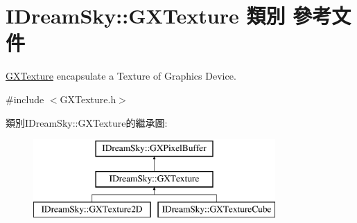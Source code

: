 \hypertarget{class_i_dream_sky_1_1_g_x_texture}{}\section{I\+Dream\+Sky\+:\+:G\+X\+Texture 類別 參考文件}
\label{class_i_dream_sky_1_1_g_x_texture}


\hyperlink{class_i_dream_sky_1_1_g_x_texture}{G\+X\+Texture} encapsulate a Texture of Graphics Device.  




{\ttfamily \#include $<$G\+X\+Texture.\+h$>$}

類別\+I\+Dream\+Sky\+:\+:G\+X\+Texture的繼承圖\+:\begin{figure}[H]
\begin{center}
\leavevmode
\includegraphics[height=3.000000cm]{class_i_dream_sky_1_1_g_x_texture}
\end{center}
\end{figure}
